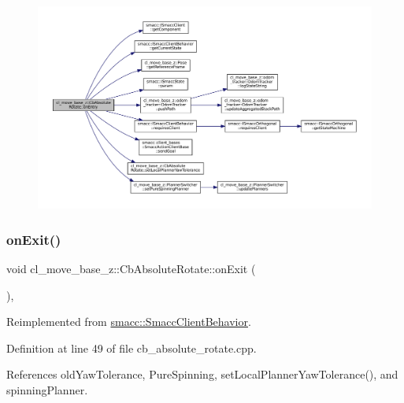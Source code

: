 \begin{figure}[H]
\begin{center}
\leavevmode
\includegraphics[width=350pt]{classcl__move__base__z_1_1CbAbsoluteRotate_a10418ea360809fa649d295716b152b2b_cgraph}
\end{center}
\end{figure}
\mbox{\label{classcl__move__base__z_1_1CbAbsoluteRotate_a0e362b8e9f0d7de5aeee183ba4031437}} 
\subsubsection{\texorpdfstring{on\+Exit()}{onExit()}}
{\footnotesize\ttfamily void cl\+\_\+move\+\_\+base\+\_\+z\+::\+Cb\+Absolute\+Rotate\+::on\+Exit (\begin{DoxyParamCaption}{ }\end{DoxyParamCaption})\hspace{0.3cm}{\ttfamily [override]}, {\ttfamily [virtual]}}



Reimplemented from \hyperlink{classsmacc_1_1SmaccClientBehavior_a7e4fb6ce81ff96dc172425852d69c0c5}{smacc\+::\+Smacc\+Client\+Behavior}.



Definition at line 49 of file cb\+\_\+absolute\+\_\+rotate.\+cpp.



References old\+Yaw\+Tolerance, Pure\+Spinning, set\+Local\+Planner\+Yaw\+Tolerance(), and spinning\+Planner.


